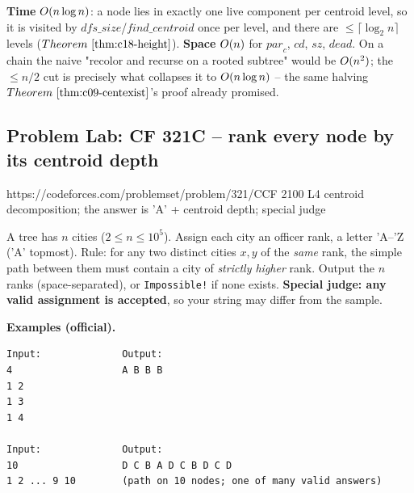 \begin{complexitybox}
\textbf{Time} \(O(n\log n)\): a node lies in exactly one live component per
centroid level, so it is visited by \(\mathit{dfs\_size}\)/\(\mathit{find\_centroid}\)
once per level, and there are \(\le\lceil\log_2 n\rceil\) levels
(\(\thmref{c18-height}\)). \textbf{Space} \(O(n)\) for \(\mathit{par}_c\),
\(\mathit{cd}\), \(\mathit{sz}\), \(\mathit{dead}\). On a chain the naive
"recolor and recurse on a rooted subtree" would be \(O(n^2)\); the
\(\le n/2\) cut is precisely what collapses it to \(O(n\log n)\) -- the same
halving \(\thmref{c09-centexist}\)'s proof already promised.
\end{complexitybox}

\subsection{Problem Lab: CF 321C -- rank every node by its centroid depth}

  {https://codeforces.com/problemset/problem/321/C}{CF 2100 L4}
  {centroid decomposition; the answer is 'A' + centroid depth; special judge}

\begin{problemstatement}
A tree has \(n\) cities (\(2\le n\le 10^5\)). Assign each city an officer rank, a
letter \(\text{'A}\)–\(\text{'Z}\) ('A' topmost). Rule: for any two distinct cities
\(x,y\) of the \emph{same} rank, the simple path between them must contain a city
of \emph{strictly higher} rank. Output the \(n\) ranks (space-separated), or
\texttt{Impossible!} if none exists. \textbf{Special judge: any valid assignment
is accepted}, so your string may differ from the sample.

\textbf{Examples (official).}
\begin{verbatim}
Input:              Output:
4                   A B B B
1 2
1 3
1 4

Input:              Output:
10                  D C B A D C B D C D
1 2 ... 9 10        (path on 10 nodes; one of many valid answers)
\end{verbatim}
\end{problemstatement}

